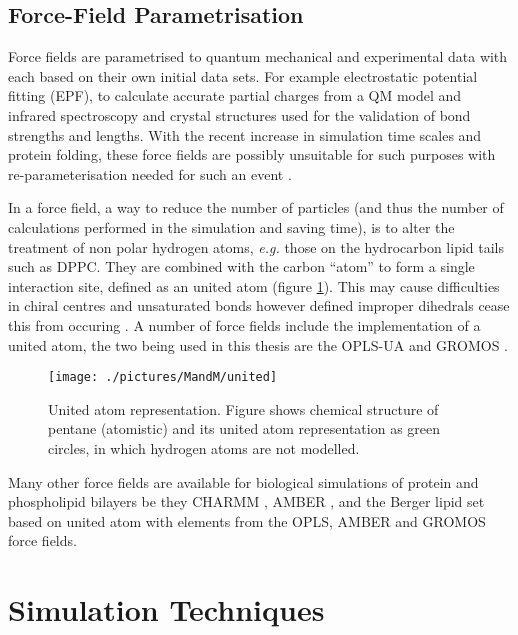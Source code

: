 \subsection{Force-Field Parametrisation} 

Force fields are parametrised to quantum mechanical and experimental data \cite{Leach2001} with each based on their own initial data sets. For example electrostatic potential fitting (EPF), to calculate accurate partial charges from a QM model and infrared spectroscopy and crystal structures used for the validation of bond strengths and lengths. With the recent increase in simulation time scales and protein folding, these force fields are possibly unsuitable for such purposes with re-parameterisation needed for such an event \cite{Piana2011,Piana2014}. 

In a force field, a way to reduce the number of particles (and thus the number of calculations performed in the simulation and saving time), is to alter the treatment of non polar hydrogen atoms, \textit{e.g.} those on the hydrocarbon lipid tails such as DPPC. They are combined with the carbon ``atom'' to form a single interaction site, defined as an united atom (figure \ref{fig:united}). This may cause difficulties in chiral centres and unsaturated bonds however defined improper dihedrals cease this from occuring \cite{Leach2001}. A number of force fields include the implementation of a united atom, the two being used in this thesis are the OPLS-UA \cite{Jorgensen1984} and GROMOS \cite{Scott1999,Schuler2001}.  

\begin{figure}[H]
\begin{center}
\texttt{[image: ./pictures/MandM/united]}
\caption[United atom representation.] {United atom representation. Figure shows chemical structure of pentane (atomistic) and its united atom representation as green circles, in which hydrogen atoms are not modelled. }
\label{fig:united}
\end{center}
\end{figure}

Many other force fields are available for biological simulations of protein and phospholipid bilayers be they CHARMM \cite{Mackerell1998}, AMBER \cite{Wang2004}, and the Berger lipid set \cite{Berger1997} based on united atom with elements from the OPLS, AMBER and GROMOS force fields. 

\newpage

\section{Simulation Techniques}

